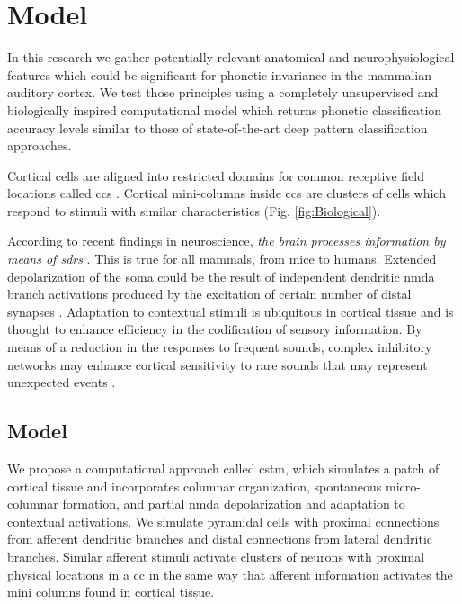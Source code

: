 \documentclass[11pt,a4paper]{article}
\begin{document}
\iffalse


\section{Model}


In this research we gather potentially relevant anatomical and neurophysiological features which could be significant for phonetic invariance in the mammalian auditory cortex. We test those principles using a completely unsupervised and biologically inspired computational model which returns phonetic classification accuracy levels similar to those of state-of-the-art deep pattern classification approaches.


Cortical cells are aligned into restricted domains for common receptive field locations called \glspl{cc} \cite{mountcastle_1955, mountcastle_1957, hubel_1962, hubel_1968}. Cortical mini-columns inside \glspl{cc} are clusters of cells which respond to stimuli with similar characteristics (Fig. \ref{fig:Biological}).

According to recent findings in neuroscience,
\emph{the brain processes information by means of \glspl{sdr}}
\cite{barth_2012}.
This is true for all mammals, from mice to humans. Extended depolarization of the soma could be the result of independent dendritic \gls{nmda} branch activations produced by the excitation of certain number of distal synapses \cite{antic_2010, major_2013}. Adaptation to contextual stimuli is ubiquitous in cortical tissue and is thought to enhance efficiency in the codification of sensory information. By means of a reduction in the responses to frequent sounds, complex inhibitory networks may enhance cortical sensitivity to rare sounds that may represent unexpected events \cite{Natan2015ComplementaryCO,nachum_2003,Javitt11962}.

\subsection*{Model}
We propose a computational approach called \gls{cstm}, which simulates a patch of cortical tissue and incorporates columnar organization, spontaneous micro-columnar formation, and partial \gls{nmda} depolarization and adaptation to contextual activations. We simulate pyramidal cells with proximal connections from afferent dendritic branches and distal connections from lateral dendritic branches. Similar afferent stimuli activate clusters of neurons with proximal physical locations in a \gls{cc} in the same way that afferent information activates the mini columns found in cortical tissue.
\end{document}
